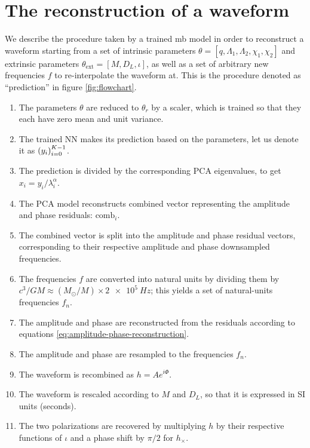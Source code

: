 \documentclass[main.tex]{subfiles}
\begin{document}
\section{The reconstruction of a waveform}

We describe the procedure taken by a trained \ac{mb} model in order to reconstruct a waveform starting from a set of intrinsic parameters \(\theta = [q, \Lambda_1 , \Lambda_2 , \chi_1 , \chi_2 ]\) and extrinsic parameters \(\theta _{\text{ext}} = [M, D_L, \iota]\), as well as a set of arbitrary new frequencies \(f\) to re-interpolate the waveform at. 
This is the procedure denoted as ``prediction'' in figure \ref{fig:flowchart}.

\begin{enumerate}
    \item The parameters \(\theta \) are reduced to \(\theta _r\) by a scaler, which is trained so that they each have zero mean and unit variance. \label{item:param-reduction}
    \item The trained \ac{NN} makes its prediction based on the parameters, let us denote it as \(\qty(y_i)_{i=0}^{K-1}\). \label{item:nn-prediction}
    \item The prediction is divided by the corresponding \ac{PCA} eigenvalues, to get \(x_i = y_i / \lambda _i^{\alpha }\).
    \item The \ac{PCA} model reconstructs combined vector representing the amplitude and phase residuals: \(\text{comb}_i\). \label{item:pca-reconstruction}
    \item The combined vector is split into the amplitude and phase residual vectors, corresponding to their respective amplitude and phase downsampled frequencies. \label{item:combined-split}
    \item The frequencies \(f\) are converted into natural units by dividing them by \(c^3 / GM \approx (M_{\odot} / M) \times  \SI{2e5}{Hz}\); this yields a set of natural-units frequencies \(f_n\). \label{item:frequency-conversion}
    \item The amplitude and phase are reconstructed from the residuals according to equations \eqref{eq:amplitude-phase-reconstruction}. \label{item:tf2}
    \item The amplitude and phase are resampled to the frequencies \(f_n\). \label{item:resample}
    \item The waveform is recombined as \(h = A e^{i \Phi }\). \label{item:recombine}
    \item The waveform is rescaled according to \(M\) and \(D_L\), so that it is expressed in \ac{SI} units (seconds). \label{item:rescale}
    \item The two polarizations are recovered by multiplying \(h\) by their respective functions of \(\iota \) and a phase shift by \(\pi /2\) for \(h_ \times \). \label{item:polarizations}
\end{enumerate}
\end{document}
